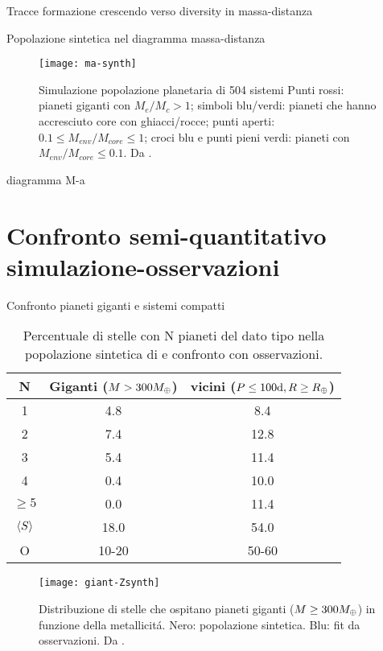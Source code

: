 \begin{wordonframe}{Tracce formazione}
crescendo verso diversity in massa-distanza
\end{wordonframe}

\begin{frame}{Popolazione sintetica nel diagramma massa-distanza}
\begin{figure}[!ht]
	\texttt{[image: ma-synth]}
	\caption{Simulazione popolazione planetaria di 504 sistemi Punti rossi: pianeti giganti con $M_e/M_c>1$; simboli blu/verdi: pianeti che hanno accresciuto core con ghiacci/rocce; punti aperti: $0.1\leq M_{env}/M_{core}\leq1$; croci blu e punti pieni verdi: pianeti con $M_{env}/M_{core}\leq0.1$. Da \cite{mordasini2018planetary}.}\label{fig:ma-synth}
\end{figure}
\end{frame}

\begin{wordonframe}{diagramma M-a}

\end{wordonframe}

\section{Confronto semi-quantitativo simulazione-osservazioni}

\begin{frame}{Confronto pianeti giganti e sistemi compatti}
\begin{table}
	\begin{tabular}{|ccc|}
		\hline
		N&Giganti ($M>300M_{\oplus}{}$)&vicini ($P\leq100\si{\day}, R\geq\rearth{}$)\\
		\hline
		1&4.8&8.4\\
		2&7.4&12.8\\
		3&5.4&11.4\\
		4&0.4&10.0\\
		$\geq5$&0.0&11.4\\
		$\langle S \rangle$&18.0&54.0\\
		O&10-20&50-60\\
		\hline
	\end{tabular}
	\caption{Percentuale di stelle con N pianeti del dato tipo nella popolazione sintetica di \cite{mordasini2018planetary} e confronto con osservazioni.}\label{tab:planetfreq}
\end{table}

\begin{figure}[!ht]
	\texttt{[image: giant-Zsynth]}
	\caption{Distribuzione di stelle che ospitano pianeti giganti ($M\geq300M_{\oplus}{}$) in funzione della metallicit\'a. Nero: popolazione sintetica. Blu: fit da osservazioni. Da \cite{mordasini2018planetary}. }\label{fig:giant-Zsynth}
\end{figure}
\end{frame}

